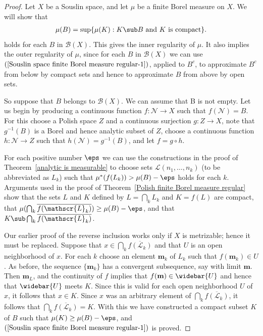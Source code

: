 \begin{proof}
Let $X$ be a Souslin space, and let $\mu$ be a finite Borel measure on $X$. We will show that
\begin{align}\label{Souslin space finite Borel measure regular-1}
\mu(B)=\sup\{\mu(K):K\sub B\text{ and $K$ is compact}\}.
\end{align}
holds for each $B$ in $\mathcal{B}(X)$. This gives the inner regularity of $\mu$. It also implies the outer regularity of $\mu$, since for each $B$ in $\mathcal{B}(X)$ we can use $(\ref{Souslin space finite Borel measure regular-1})$, applied to $B^c$, to approximate $B^c$ from below by compact sets and hence to approximate $B$ from above by open sets.\par
So suppose that $B$ belongs to $\mathcal{B}(X)$. We can assume that B is not empty. Let us begin by producing a continuous function $f:\mathscr{N}\to X$ such that $f(\mathscr{N})=B$. For this choose a Polish space $Z$ and a continuous surjection $g:Z\to X$, note that $g^{-1}(B)$ is a Borel and hence analytic subset of $Z$, choose a continuous function $h:\mathscr{N}\to Z$ such that $h(\mathscr{N})=g^{-1}(B)$, and let $f=g\circ h$.\par
For each positive number $\eps$ we can use the constructions in the proof of Theorem~\ref{analytic is measurable} to choose sets $\mathscr{L}(n_1,\dots,n_k)$ (to be abbreviated as $L_k$) such that $\mu^*(f(L_k))>\mu(B)-\eps$ holds for each $k$. Arguments used in the proof of Theorem~\ref{Polish finite Borel measure regular} show that the sets $L$ and $K$ defined by $L=\bigcap_kL_k$ and $K=f(L)$ are compact, that $\mu(\bigcap_k\overline{f(\mathscr{L}_k)})\geq\mu(B)-\eps$, and that $K\sub\bigcap_k\overline{f(\mathscr{L}_k)}$.\par
Our earlier proof of the reverse inclusion works only if $X$ is metrizable; hence it must be replaced. Suppose that $x\in\bigcap_k\overline{f(\mathscr{L}_k)}$ and that $U$ is an open neighborhood of $x$. For each $k$ choose an element $\mathbf{m}_k$ of $L_k$ such that $f(\mathbf{m}_k)\in U$. As before, the sequence $\{\mathbf{m}_k\}$ has a convergent subsequence, say with limit $\mathbf{m}$. Then $\mathbf{m}_L$, and the continuity of $f$ implies that $f(\mathbf{m})\in\widebar{U}$ and hence that $\widebar{U}$ meets $K$. Since this is valid for each open neighborhood $U$ of $x$, it follows that $x\in K$. Since $x$ was an arbitrary element of $\bigcap_k\overline{f(\mathscr{L}_k)}$, it follows that $\bigcap_k\overline{f(\mathscr{L}_k)}=K$. With this we have constructed a compact subset $K$ of $B$ such that $\mu(K)\geq\mu(B)-\eps$, and $(\ref{Souslin space finite Borel measure regular-1})$ is proved.
\end{proof}
\newpage
